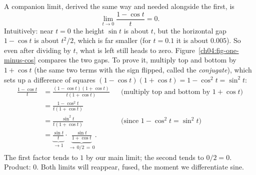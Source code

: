 A companion limit, derived the same way and needed alongside the first, is
\[
  \lim_{t\to 0}\frac{1 - \cos t}{t} = 0.
\]
Intuitively: near $t=0$ the height $\sin t$ is about $t$, but the horizontal gap $1-\cos t$ is about $t^2/2$, which is far smaller (for $t = 0.1$ it is about $0.005$). So even after dividing by $t$, what is left still heads to zero. Figure~\ref{ch04:fig-one-minus-cos} compares the two gaps. To prove it, multiply top and bottom by $1+\cos t$ (the same two terms with the sign flipped, called the \emph{conjugate}), which sets up a difference of squares $(1-\cos t)(1+\cos t) = 1-\cos^2 t = \sin^2 t$:
\begin{align*}
  \frac{1-\cos t}{t}
  &= \frac{(1-\cos t)(1+\cos t)}{t(1+\cos t)}
    &&\text{(multiply top and bottom by $1+\cos t$)}\\
  &= \frac{1-\cos^2 t}{t(1+\cos t)}\\
  &= \frac{\sin^2 t}{t(1+\cos t)}
    &&\text{(since $1-\cos^2 t = \sin^2 t$)}\\
  &= \underbrace{\frac{\sin t}{t}}_{\to 1}\cdot \underbrace{\frac{\sin t}{1+\cos t}}_{\to\, 0/2\,=\,0}.
\end{align*}
The first factor tends to $1$ by our main limit; the second tends to $0/2 = 0$. Product: $0$. Both limits will reappear, fused, the moment we differentiate sine.

